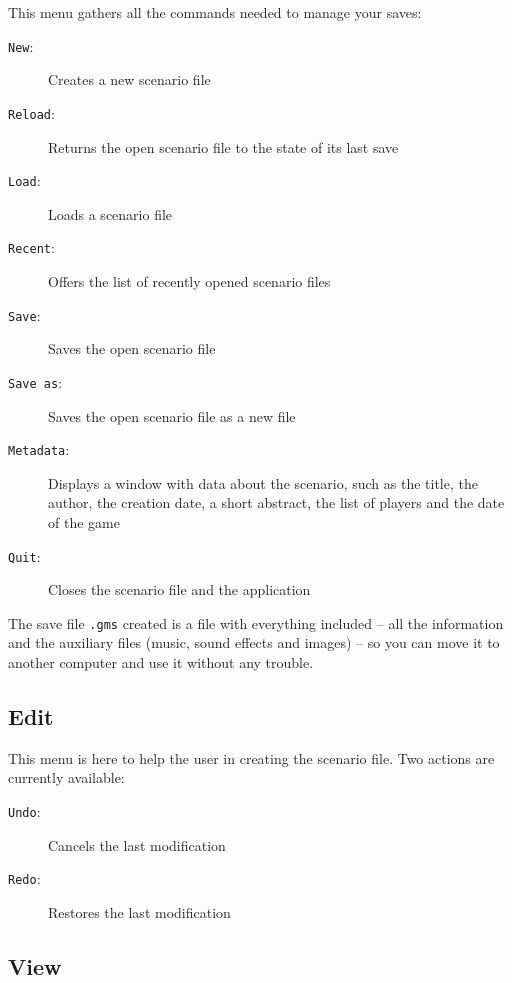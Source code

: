 \documentclass[a4paper,12pt]{article}
\newcommand*{\interfaceitem}[1]{\texttt{#1}}
\begin{document}
This menu gathers all the commands needed to manage your saves:
\begin{description}
    \item[\interfaceitem{New}:]{Creates a new scenario file}
    \item[\interfaceitem{Reload}:]{Returns the open scenario file to the state of its last save}
    \item[\interfaceitem{Load}:]{Loads a scenario file}
    \item[\interfaceitem{Recent}:]{Offers the list of recently opened scenario files}
    \item[\interfaceitem{Save}:]{Saves the open scenario file}
    \item[\interfaceitem{Save as}:]{Saves the open scenario file as a new file}
    \item[\interfaceitem{Metadata}:]{Displays a window with data about the scenario, such as the title, the author, the creation date, a short abstract, the list of players and the date of the game}
    \item[\interfaceitem{Quit}:]{Closes the scenario file and the application}
\end{description}


The save file \texttt{.gms} created is a file with everything included -- all the information and the auxiliary files (music, sound effects and images) -- so you can move it to another computer and use it without any trouble.

\subsection{Edit}
\label{sec:edit}

This menu is here to help the user in creating the scenario file. Two actions are currently available:
\begin{description}
    \item[\interfaceitem{Undo}:]{Cancels the last modification}
    \item[\interfaceitem{Redo}:]{Restores the last modification}
\end{description}

\subsection{View}
\label{sec:view}
\end{document}
